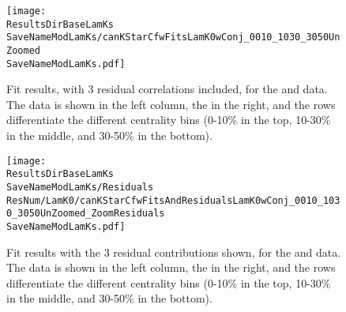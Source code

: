 \documentclass[/home/jesse/Analysis/FemtoAnalysis/AnalysisNotes/AnalysisNoteJBuxton.tex]{subfiles}
\renewcommand{\NonFlatBgdLamKch}{_NonFlatBgdCrctnLamK0LinearLamKchPolynomial}
\renewcommand{\NonFlatBgdLamKs}{_NonFlatBgdCrctnLamK0LinearLamKchPolynomial}
\renewcommand{\ResNum}{_3Res}
\renewcommand{\PrimMaxDecay}{_PrimMaxDecay10fm}
\renewcommand{\SaveNameModLamKch}{\MomRes\NonFlatBgdLamKch\ResNum\PrimMaxDecay\ResMethod\ParamFixAndShareLamKch}
\renewcommand{\SaveNameModLamKs}{\MomRes\NonFlatBgdLamKs\ResNum\PrimMaxDecay\ResMethod\ParamFixAndShareLamKch}
\begin{document}
\begin{figure}[h]
  \centering
  \texttt{[image: \\ResultsDirBaseLamKs\\SaveNameModLamKs/canKStarCfwFitsLamK0wConj\_0010\_1030\_3050UnZoomed\\SaveNameModLamKs.pdf]}
  \caption[\LamALamKs data with fits: 3 residuals]
  {
  Fit results, with 3 residual correlations included, for the \LamKs and \ALamKs data.
  The \LamKs data is shown in the left column, the \ALamKs in the right, and the rows differentiate the different centrality bins (0-10\% in the top, 10-30\% in the middle, and 30-50\% in the bottom).
  }
  \label{figApp:LamKswConjFits_3Res}
\end{figure}


\begin{figure}[h]
  \centering
  \texttt{[image: \\ResultsDirBaseLamKs\\SaveNameModLamKs/Residuals\\ResNum/LamK0/canKStarCfwFitsAndResidualsLamK0wConj\_0010\_1030\_3050UnZoomed\_ZoomResiduals\\SaveNameModLamKs.pdf]}
  \caption[\LamKsALamKs fit contribution from residuals: 3 residuals]
  {
  Fit results with the 3 residual contributions shown, for the \LamKs and \ALamKs data.
  The \LamKs data is shown in the left column, the \ALamKs in the right, and the rows differentiate the different centrality bins (0-10\% in the top, 10-30\% in the middle, and 30-50\% in the bottom).
  }
  \label{figApp:LamKswConjFitsAndResiduals_3Res}
\end{figure}

\begin{comment}
\begin{landscape}





\end{landscape}
\end{comment}



\clearpage
\end{document}
